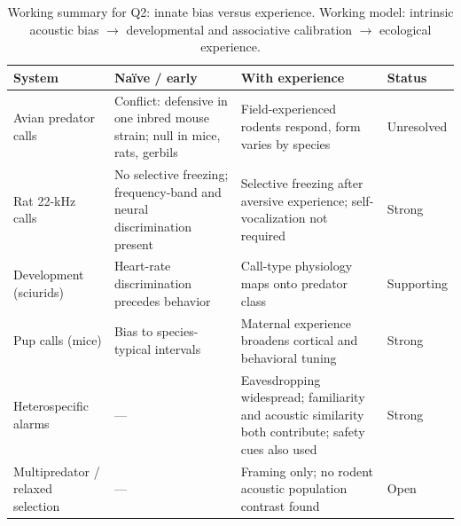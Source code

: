 \begin{table}[tbp]
\centering
\footnotesize
\singlespacing
\caption{Working summary for Q2: innate bias versus experience. Working model: intrinsic acoustic bias $\rightarrow$ developmental and associative calibration $\rightarrow$ ecological experience.}
\label{tab:summary-q2}
\begin{tabular}{@{}p{1.3in}p{1.45in}p{2.55in}p{0.85in}@{}}
\toprule
\textbf{System} & \textbf{Na\"ive / early} & \textbf{With experience} & \textbf{Status} \\
\midrule
Avian predator calls & Conflict: defensive in one inbred mouse strain; null in mice, rats, gerbils & Field-experienced rodents respond, form varies by species & Unresolved \\
\addlinespace[2pt]
Rat 22-kHz calls & No selective freezing; frequency-band and neural discrimination present & Selective freezing after aversive experience; self-vocalization not required & Strong \\
\addlinespace[2pt]
Development (sciurids) & Heart-rate discrimination precedes behavior & Call-type physiology maps onto predator class & Supporting \\
\addlinespace[2pt]
Pup calls (mice) & Bias to species-typical intervals & Maternal experience broadens cortical and behavioral tuning & Strong \\
\addlinespace[2pt]
Heterospecific alarms & --- & Eavesdropping widespread; familiarity and acoustic similarity both contribute; safety cues also used & Strong \\
\addlinespace[2pt]
Multipredator / relaxed selection & --- & Framing only; no rodent acoustic population contrast found & Open \\
\bottomrule
\end{tabular}
\end{table}
